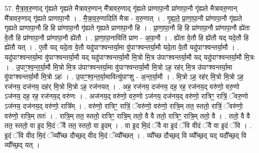 \documentclass[17pt]{extarticle}
\begin{document}
57. मै॒त्रा॒व॒रु॒णाद् गृ॑ह्यते गृह्यते मैत्रावरु॒णान् मै᳚त्रावरु॒णाद् गृ॑ह्यते प्राणापा॒नौ प्रा॑णापा॒नौ गृ॑ह्यते मैत्रावरु॒णान् मै᳚त्रावरु॒णाद् गृ॑ह्यते प्राणापा॒नौ । . मै॒त्रा॒व॒रु॒णादिति॑ मैत्रा - व॒रु॒णात् । . गृ॒ह्य॒ते॒ प्रा॒णा॒पा॒नौ प्रा॑णापा॒नौ गृ॑ह्यते गृह्यते प्राणापा॒नौ हि हि प्रा॑णापा॒नौ गृ॑ह्यते गृह्यते प्राणापा॒नौ हि । . प्रा॒णा॒पा॒नौ हि हि प्रा॑णापा॒नौ प्रा॑णापा॒नौ ह्ये॑ता वे॒तौ हि प्रा॑णापा॒नौ प्रा॑णापा॒नौ ह्ये॑तौ । . प्रा॒णा॒पा॒नाविति॑ प्राण - अ॒पा॒नौ । . ह्ये॑ता वे॒तौ हि ह्ये॑तौ यद् यदे॒तौ हि ह्ये॑तौ यत् । . ए॒तौ यद् यदे॒ता वे॒तौ यदु॑पाꣳश्वन्तर्या॒मा वु॑पाꣳश्वन्तर्या॒मौ यदे॒ता वे॒तौ यदु॑पाꣳश्वन्तर्या॒मौ । . यदु॑पाꣳश्वन्तर्या॒मा वु॑पाꣳश्वन्तर्या॒मौ यद् यदु॑पाꣳश्वन्तर्या॒मौ मि॒त्रो मि॒त्र उ॑पाꣳश्वन्तर्या॒मौ यद् यदु॑पाꣳश्वन्तर्या॒मौ मि॒त्रः । . उ॒पाꣳ॒॒श्व॒न्त॒र्या॒मौ मि॒त्रो मि॒त्र उ॑पाꣳश्वन्तर्या॒मा वु॑पाꣳश्वन्तर्या॒मौ मि॒त्रो ऽह॒ रह॑र् मि॒त्र उ॑पाꣳश्वन्तर्या॒मा वु॑पाꣳश्वन्तर्या॒मौ मि॒त्रो ऽहः॑ । . उ॒पाꣳ॒॒श्व॒न्त॒र्या॒मावित्यु॑पाꣳशु - अ॒न्त॒र्या॒मौ । . मि॒त्रो ऽह॒ रह॑र् मि॒त्रो मि॒त्रो ऽह॒ रज॑नय॒ दज॑नय॒ दह॑र् मि॒त्रो मि॒त्रो ऽह॒ रज॑नयत् । . अह॒ रज॑नय॒ दज॑नय॒ दह॒ रह॒ रज॑नय॒द् वरु॑णो॒ वरु॒णो ऽज॑नय॒ दह॒ रह॒ रज॑नय॒द् वरु॑णः । . अज॑नय॒द् वरु॑णो॒ वरु॒णो ऽज॑नय॒ दज॑नय॒द् वरु॑णो॒ रात्रिꣳ॒॒ रात्रिं॒ ॅवरु॒णो ऽज॑नय॒ दज॑नय॒द् वरु॑णो॒ रात्रि᳚म् । . वरु॑णो॒ रात्रिꣳ॒॒ रात्रिं॒ ॅवरु॑णो॒ वरु॑णो॒ रात्रि॒म् तत॒ स्ततो॒ रात्रिं॒ ॅवरु॑णो॒ वरु॑णो॒ रात्रि॒म् ततः॑ । . रात्रि॒म् तत॒ स्ततो॒ रात्रिꣳ॒॒ रात्रि॒म् ततो॒ वै वै ततो॒ रात्रिꣳ॒॒ रात्रि॒म् ततो॒ वै । . ततो॒ वै वै तत॒ स्ततो॒ वा इ॒द मि॒दं ॅवै तत॒ स्ततो॒ वा इ॒दम् । . वा इ॒द मि॒दं ॅवै वा इ॒दं ॅवि वीदं ॅवै वा इ॒दं ॅवि । . इ॒दं ॅवि वीद मि॒दं ॅव्यौ᳚च्छ दौच्छ॒द् वीद मि॒दं ॅव्यौ᳚च्छत् । . व्यौ᳚च्छ दौच्छ॒द् वि व्यौ᳚च्छ॒द् यद् यदौ᳚च्छ॒द् वि व्यौ᳚च्छ॒द् यत् । \newline
\end{document}
